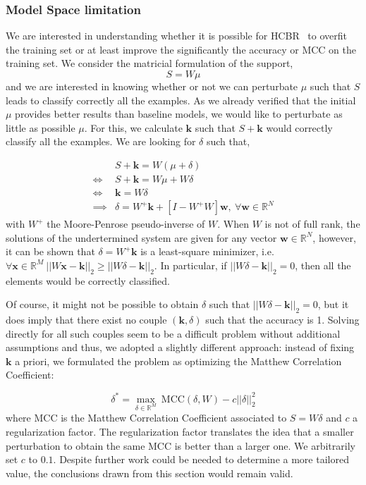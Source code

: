 \documentclass[preprint,12pt]{elsarticle}
\def\HCBR{{\sc HCBR}}
\theoremstyle{definition}
\begin{document}
\subsubsection{Model Space limitation} We are interested in understanding whether it is possible for \HCBR~ to overfit the training set or at least improve the significantly the accuracy or MCC on the training set. We consider the matricial formulation of the support,
\begin{equation}
  S = W\mu
\end{equation}
and we are interested in knowing whether or not we can perturbate $\mu$ such that $S$ leads to classify correctly all the examples.%
As we already verified that the initial $\mu$ provides better results than baseline models, we would like to perturbate as little as possible $\mu$. For this, we calculate $\mathbf k$ such that $S + \mathbf k$ would correctly classify all the examples. We are looking for $\delta$ such that,

\begin{align}
 & S + \mathbf k  = W(\mu + \delta) \\
\Leftrightarrow & S + \mathbf k  = W\mu + W\delta \\
\Leftrightarrow & \mathbf k  = W\delta \\
\implies & \delta  = W^+ \mathbf k + [I - W^+W]\mathbf w, ~ \forall \mathbf w \in \mathbb{R}^N
\end{align}
with $W^+$ the Moore-Penrose pseudo-inverse of $W$. When $W$ is not of full rank, the solutions of the undertermined system are given for any vector $\mathbf w \in \mathbb{R}^N$, however, it can be shown that $\delta  = W^+\mathbf k$ is a least-square minimizer, i.e. $\forall \mathbf x \in \mathbb{R}^M ~ ||W\mathbf x -\mathbf k||_2 \geq ||W\delta - \mathbf k||_2$. In particular, if $||W\delta - \mathbf k||_2 = 0$, then all the elements would be correctly classified.

Of course, it might not be possible to obtain  $\delta$ such that $||W\delta - \mathbf k||_2 = 0$, but it does imply that there exist no couple $(\mathbf k, \delta)$ such that the accuracy is 1. Solving directly for all such couples seem to be a difficult problem without additional assumptions and thus, we adopted a slightly different approach: instead of fixing $\mathbf k$ a priori, we formulated the problem as optimizing the Matthew Correlation Coefficient:

\begin{equation}
\label{eq:opti_MCC}
\delta^* = \underset{\delta \in \mathbb{R}^M}{\max} ~ \text{MCC}(\delta, W) - c ||\delta||^2_2
\end{equation} where MCC is the Matthew Correlation Coefficient associated to $S = W \delta$ and $c$ a regularization factor. The regularization factor translates the idea that a smaller perturbation to obtain the same MCC is better than a larger one. We arbitrarily set $c$ to $0.1$. Despite further work could be needed to determine a more tailored value, the conclusions drawn from this section would remain valid.
\end{document}
